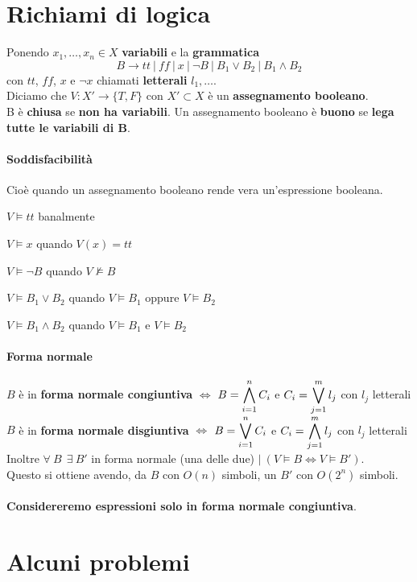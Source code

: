 \documentclass[10pt]{book}
\begin{document}
\section{Richiami di logica}
Ponendo $x_1,\ldots,x_n \in X$ \textbf{variabili} e la \textbf{grammatica} $$B\longrightarrow tt\:|\:ff\:|\:x\:|\:\neg B\:|\:B_1 \vee B_2\:|\:B_1 \wedge B_2$$ con $tt$, $ff$, $x$ e $\neg x$ chiamati \textbf{letterali} $l_1,\ldots$.\\
Diciamo che $V : X' \longrightarrow \{T, F\}$ con $X' \subset X$ è un \textbf{assegnamento booleano}.\\
B è \textbf{chiusa} se \textbf{non ha variabili}. Un assegnamento booleano è \textbf{buono} se \textbf{lega tutte le variabili di B}.
\paragraph{Soddisfacibilità} Cioè quando un assegnamento booleano rende vera un'espressione booleana.\begin{list}{}{}
	\item $V \vDash tt$ banalmente
	\item $V \vDash x$ quando $V(x) = tt$
	\item $V \vDash \neg B$ quando $V \not\vDash B$
	\item $V \vDash B_1 \vee B_2$ quando $V \vDash B_1$ oppure $V \vDash B_2$
	\item $V \vDash B_1 \wedge B_2$ quando $V \vDash B_1$ e $V \vDash B_2$
\end{list}
\paragraph{Forma normale} $B$ è in \textbf{forma normale congiuntiva} $\Leftrightarrow$ $B = \mathlarger{\bigwedge_{i=1}^n C_i}$ e $C_i = \mathlarger{\bigvee_{j=1}^m l_j}$ con $l_j$ letterali\\
$B$ è in \textbf{forma normale disgiuntiva} $\Leftrightarrow$ $B = \mathlarger{\bigvee_{i=1}^n C_i}$ e $C_i = \mathlarger{\bigwedge_{j=1}^m l_j}$ con $l_j$ letterali\\
Inoltre $\forall\:B\:\:\exists\:B'$ in forma normale (una delle due) $|\:(V\vDash B \Leftrightarrow V\vDash B')$.\\
Questo si ottiene avendo, da $B$ con $O(n)$ simboli, un $B'$ con $O(2^n)$ simboli.\\\\
\textbf{Considereremo espressioni solo in forma normale congiuntiva}.
\section{Alcuni problemi}
\end{document}
